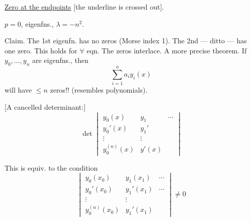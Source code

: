 \underline{Zero at the endpoints} [the underline is crossed out].
\par\noindent\begin{minipage}{\linewidth}
$p=0$, eigenfns., $\lambda=-n^2$.
\end{minipage}\par
Claim. The 1st eigenfn. has no zeros (Morse index 1).
The 2nd --- ditto --- has one zero.
This holds for $\forall$ eqn.
The zeros interlace.
A more precise theorem. If $y_0,\ldots,y_n$ are eigenfns.,
then
\begin{equation*}
\sum_{i=1}^{n}a_i y_i(x)
\end{equation*}
will have $\leq n$ zeros!!
(resembles polynomials).
\par\noindent\begin{minipage}{\linewidth}
[A cancelled determinant:]
\begin{equation*}
\det\begin{vmatrix}
y_0(x)&y_1&\cdots\\
y_0'(x)&y_1'&\\
\vdots&\vdots&\\
y_0^{(n)}(x)&y'(x)&
\end{vmatrix}
\end{equation*}
\end{minipage}\par
\par\noindent\begin{minipage}{\linewidth}
This is equiv. to the condition
\begin{equation*}
\begin{vmatrix}
y_0(x_0)&y_1(x_1)&\cdots\\
y_0'(x_0)&y_1'(x_1)&\cdots\\
\vdots&\vdots&\\
y_0^{(n)}(x_0)&y_1'(x_1)&
\end{vmatrix}\neq0
\end{equation*}
\end{minipage}\par
